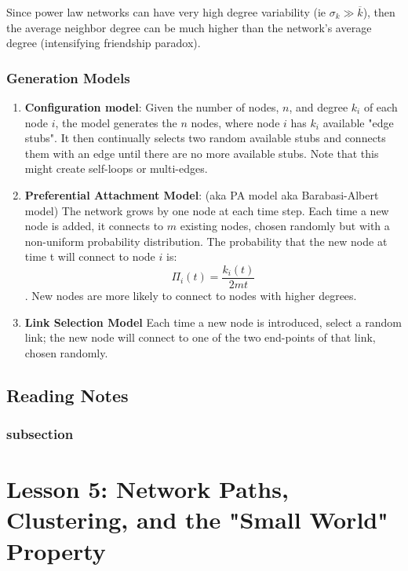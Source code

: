 \documentclass[11pt]{scrartcl} %
\begin{document}
Since power law networks can have very high degree variability (ie $\sigma_k \gg \overline{k}$), then the average neighbor degree can be much higher than the network's average degree (intensifying friendship paradox).

\subsubsection{Generation Models}
\begin{enumerate}
	\item \textbf{Configuration model}: Given the number of nodes, $n$, and degree $k_i$ of each node $i$, the model generates the $n$ nodes, where node $i$ has $k_i$ available "edge stubs". It then continually selects two random available stubs and connects them with an edge until there are no more available stubs. Note that this might create self-loops or multi-edges.
	\item \textbf{Preferential Attachment Model}: (aka PA model aka Barabasi-Albert model) The network grows by one node at each time step. Each time a new node is added, it connects to $m$ existing nodes, chosen randomly but with a non-uniform probability distribution. The probability that the new node at time t will connect to node $i$ is:
\[ \Pi_i (t) = \frac{k_i(t)}{2mt} \]
. New nodes are more likely to connect to nodes with higher degrees. 
	\item \textbf{Link Selection Model} Each time a new node is introduced, select a random link; the new node will connect to one of the two end-points of that link, chosen randomly.
\end{enumerate}

\subsection{Reading Notes}

\subsubsection{subsection}
\textbf{}


\section{Lesson 5: Network Paths, Clustering, and the "Small World" Property}
\end{document}
